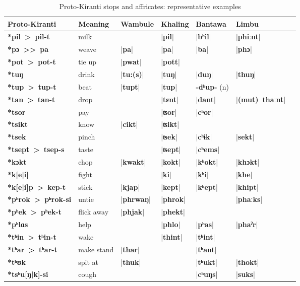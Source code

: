 \documentclass[oldfontcommands,oneside,a4paper,11pt]{article}
\newcommand{\ipa}[1]{\textbf{{\phon\mbox{#1}}}} %
\newcommand{\dhat}[1]{|\ipa{#1}|}
\begin{document}
\begin{table}[H]
\caption{Proto-Kiranti stops and affricates: representative examples} \centering \label{tab:stops.ex}
\begin{tabular}{lllllll}
\toprule
Proto-Kiranti & Meaning & Wambule & Khaling & Bantawa & Limbu\\
\midrule
\ipa{*pil > pil-t} &	milk &	&	\dhat{pil} &	\dhat{bʰil} &	\dhat{phiːnt} &	\\
\ipa{*pɔ >{}> pa} &	weave &	\dhat{pa} &	\dhat{pa} &	\dhat{ba} &	\dhat{phɔ} &	\\
\ipa{*pot > pot-t} &	tie up &	\dhat{pwat} &	\dhat{pott} &	&	&	\\
\midrule			
\ipa{*tuŋ} &	drink &	\dhat{tu:(s)} &	\dhat{tuŋ} &	\dhat{duŋ} &	\dhat{thuŋ} &	\\
\ipa{*tup > tup-t} &	beat &	\dhat{tupt} &	\dhat{tup} &	\ipa{-dʰup-} (n)&	&	\\
\ipa{*tan > tan-t} &	drop &	&	\dhat{tɛnt} &	\dhat{dant} &	\dhat{(mut) thaːnt} &	\\
\midrule				
\ipa{*tsor} &	pay &	&	\dhat{ʦor} &	\dhat{cʰor} &	&	\\
\ipa{*tsikt} &	know &	\dhat{cikt} &	\dhat{ʦikt} &	&	&	\\
\ipa{*tsek} &	pinch &	 &	\dhat{ʦek} &	\dhat{cʰɨk} &	\dhat{sekt} &	\\
\ipa{*tsept > tsep-s} &	taste &	&	\dhat{ʦept} &	\dhat{cʰems} &	&	\\
\midrule
\ipa{*kɔkt} &	chop &	\dhat{kwakt} &	\dhat{kokt} &	\dhat{kʰokt} &	\dhat{khɔkt} &	\\
\ipa{*k[e|i]} &	fight &	&	\dhat{ki} &	\dhat{kʰi} &	\dhat{khe} &	\\
\ipa{*k[e|i]p > kep-t } &	stick &	\dhat{kjap} &	\dhat{kept} &	\dhat{kʰept} &	\dhat{khipt} &	\\
\midrule				
\ipa{*pʰrok > pʰrok-si} &	untie &	\dhat{phrwaŋ} &	\dhat{phrok} &	&	\dhat{phaːks} &	\\
\ipa{*pʰek > pʰek-t} &	flick away &	\dhat{phjak} &	\dhat{phekt} &	&	 &	\\
\ipa{*pʰlɑs} &	help &	&	\dhat{phlo} &	\dhat{pʰas} &	\dhat{phaˀr} &	\\
\midrule				
\ipa{*tʰin > tʰin-t} &	wake &	&	\dhat{thint} &	\dhat{tʰint} &	&	\\
\ipa{*tʰar > tʰar-t} &	make stand &	\dhat{thar} &	&	\dhat{tʰant} &	&	\\
\ipa{*tʰʊk} &	spit at &	\dhat{thuk} &	&	\dhat{tʰukt} &	\dhat{thokt} &	\\
\midrule		
\ipa{*tsʰu[ŋ|k]-si} &	cough &	&	&	\dhat{cʰuŋs} &	\dhat{suks} &	\\

\end{tabular}
\end{table}
\end{document}
